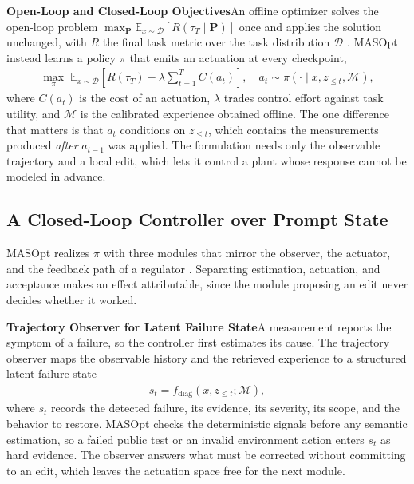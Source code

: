 \documentclass{article}
\theoremstyle{definition}
\begin{document}
\textbf{Open-Loop and Closed-Loop Objectives}\quad An offline optimizer solves the open-loop problem $\max_{\mathbf{P}} \mathbb{E}_{x \sim \mathcal{D}} [ R( \tau_T \mid \mathbf{P} ) ]$ once and applies the solution unchanged, with $R$ the final task metric over the task distribution $\mathcal{D}$ \citep{hong2026maspob,wang2026maspo}. MASOpt instead learns a policy $\pi$ that emits an actuation at every checkpoint,
\begin{gather}
    \max_{\pi} \; \mathbb{E}_{x \sim \mathcal{D}} \left[ R\left( \tau_T \right) - \lambda \sum\nolimits_{t=1}^{T} C\left( a_t \right) \right], \quad a_t \sim \pi \left( \cdot \mid x, z_{\leq t}, \mathcal{M} \right), \label{eq:objective}
\end{gather}
where $C(a_t)$ is the cost of an actuation, $\lambda$ trades control effort against task utility, and $\mathcal{M}$ is the calibrated experience obtained offline. The one difference that matters is that $a_t$ conditions on $z_{\leq t}$, which contains the measurements produced \emph{after} $a_{t-1}$ was applied. The formulation needs only the observable trajectory and a local edit, which lets it control a plant whose response cannot be modeled in advance.

\subsection{A Closed-Loop Controller over Prompt State}
\label{sec:meta_agents}

MASOpt realizes $\pi$ with three modules that mirror the observer, the actuator, and the feedback path of a regulator \citep{astrom2008feedback,goodwin2001control}. Separating estimation, actuation, and acceptance makes an effect attributable, since the module proposing an edit never decides whether it worked.

\textbf{Trajectory Observer for Latent Failure State}\quad A measurement reports the symptom of a failure, so the controller first estimates its cause. The trajectory observer maps the observable history and the retrieved experience to a structured latent failure state
\begin{gather}
    s_t = f_{\mathrm{diag}}\left( x, z_{\leq t}; \mathcal{M} \right), \label{eq:diagnose}
\end{gather}
where $s_t$ records the detected failure, its evidence, its severity, its scope, and the behavior to restore. MASOpt checks the deterministic signals before any semantic estimation, so a failed public test or an invalid environment action enters $s_t$ as hard evidence. The observer answers what must be corrected without committing to an edit, which leaves the actuation space free for the next module.
\end{document}
